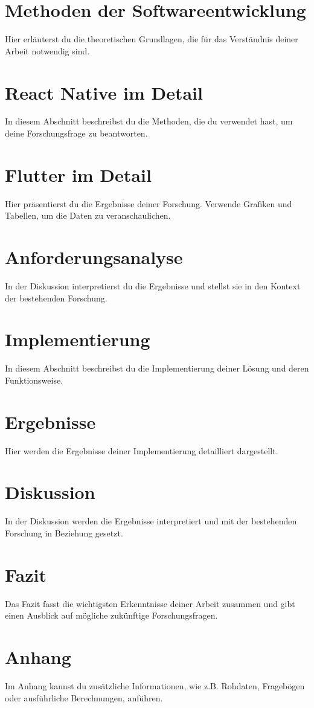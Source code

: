 \documentclass[a4paper,12pt]{article}
\begin{document}
\section{Methoden der Softwareentwicklung}
Hier erläuterst du die theoretischen Grundlagen, die für das Verständnis deiner Arbeit notwendig sind.

\section{React Native im Detail}
In diesem Abschnitt beschreibst du die Methoden, die du verwendet hast, um deine Forschungsfrage zu beantworten.

\section{Flutter im Detail}
Hier präsentierst du die Ergebnisse deiner Forschung. Verwende Grafiken und Tabellen, um die Daten zu veranschaulichen.

\section{Anforderungsanalyse}
In der Diskussion interpretierst du die Ergebnisse und stellst sie in den Kontext der bestehenden Forschung.

\section{Implementierung}
In diesem Abschnitt beschreibst du die Implementierung deiner Lösung und deren Funktionsweise.

\section{Ergebnisse}
Hier werden die Ergebnisse deiner Implementierung detailliert dargestellt.

\section{Diskussion}
In der Diskussion werden die Ergebnisse interpretiert und mit der bestehenden Forschung in Beziehung gesetzt.

\section{Fazit}
Das Fazit fasst die wichtigsten Erkenntnisse deiner Arbeit zusammen und gibt einen Ausblick auf mögliche zukünftige Forschungsfragen.

\newpage

\printbibliography

\appendix
\section{Anhang}
Im Anhang kannst du zusätzliche Informationen, wie z.B. Rohdaten, Fragebögen oder ausführliche Berechnungen, anführen.
\end{document}
